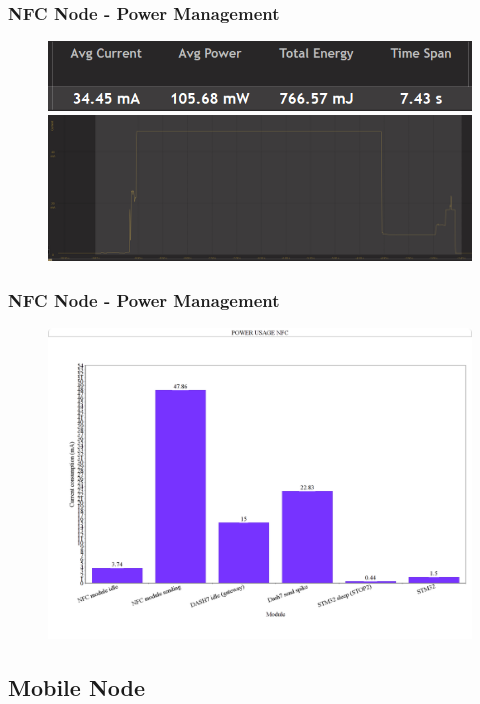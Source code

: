 \begin{frame}[fragile]
\frametitle{NFC Node - Power Management} 
\begin{figure}
  \centering
  \includegraphics[width=.5\textwidth]{images/NFC16.png} \\
	\includegraphics[width=\textwidth]{images/NFC14.png}
\end{figure}
\end{frame}

\begin{frame}[fragile]
\frametitle{NFC Node - Power Management} 
\begin{figure}
  \centering
	\includegraphics[width=\textwidth]{images/NFC15.png}
\end{figure}
\end{frame}


\subsection{Mobile Node}

